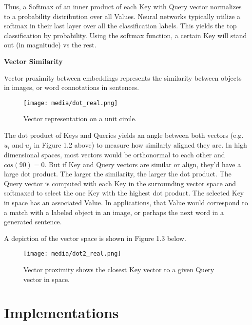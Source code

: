 Thus, a Softmax of an inner product of each Key with Query vector normalizes to a 
probability distribution over all Values. Neural networks typically utilize a softmax in their last 
layer over all the classification labels. This yields the top classification by probability. 
Using the softmax function, a certain Key will stand out (in magnitude) vs the rest.

\vspace{10mm}

\textbf{Vector Similarity}


Vector proximity between embeddings represents the similarity between objects in images, or 
word connotations in sentences.


\begin{figure}[H]
	\begin{center}
	\texttt{[image: media/dot\_real.png]}
	\end{center}
	\caption[Vector Representation]{Vector representation on a unit circle.}
	\end{figure}


The dot product of Keys and Queries yields an angle between both vectors (e.g. $u_i$ and $u_j$ in Figure 1.2 above) to measure 
how similarly aligned they are. In high dimensional spaces, most vectors would be orthonormal to each other
and $cos(90)=0$. But if Key and Query vectors are similar or align, they'd have a large dot product. 
The larger the similarity, the larger the dot product. 
The Query vector is computed with each Key in the surrounding vector space and softmaxed to 
select the one Key with the highest dot product.
The selected Key in space has an associated Value. In applications, that Value would correspond to 
a match with a labeled object in an image, or perhaps the next word in a generated sentence. 


A depiction of the vector space is shown in Figure 1.3 below.


\begin{figure}[H]
	\begin{center}
	\texttt{[image: media/dot2\_real.png]}
	\end{center}
	\caption[Key/Query Vector Proximity]{Vector proximity shows the closest Key vector to a given Query vector in space.}
	\end{figure}


\section{Implementations}

